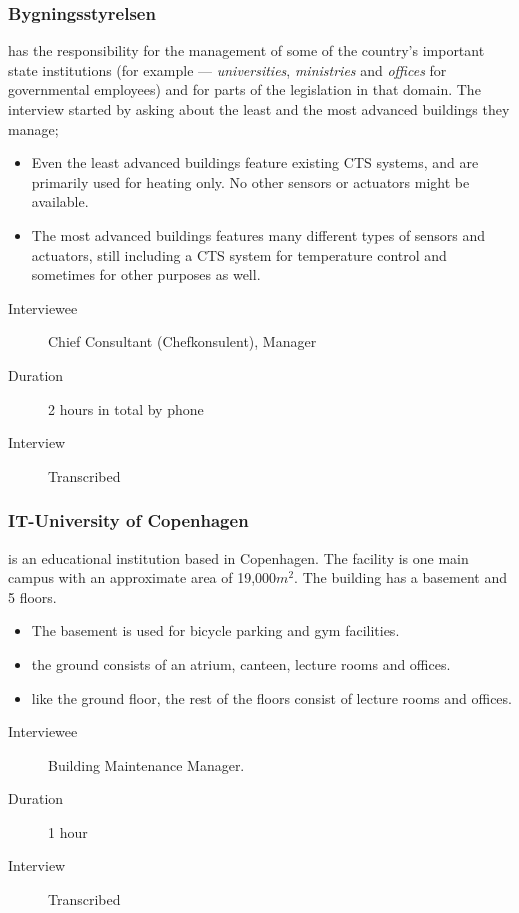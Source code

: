 \subsubsection{Bygningsstyrelsen} has the responsibility for the management of some of the country's important state institutions (for example --- \textit{universities}, \textit{ministries} and \textit{offices} for governmental employees) and for parts of the legislation in that domain. The interview started by asking about the least and the most advanced buildings they manage;
\begin{itemize}
	\item Even the least advanced buildings feature existing CTS systems, and are primarily used for heating only. No other sensors or actuators might be available.
	\item The most advanced buildings features many different types of sensors and actuators, still including a CTS system for temperature control and sometimes for other purposes as well. 
\end{itemize}	
\begin{description}
	\item[Interviewee] Chief Consultant (Chefkonsulent), Manager
	\item[Duration] 2 hours in total by phone
	\item[Interview] Transcribed
\end{description}

\subsubsection{IT-University of Copenhagen} is an educational institution based in Copenhagen. The facility is one main campus with an approximate area of 19,000$m^2$. The building has a basement and 5 floors.
\begin{itemize}
	\item The basement is used for bicycle parking and gym facilities.
	\item the ground consists of an atrium, canteen, lecture rooms and offices.
	\item like the ground floor, the rest of the floors consist of lecture rooms and offices.
\end{itemize}
\begin{description}
	\item[Interviewee] Building Maintenance Manager.
	\item[Duration] 1 hour
	\item[Interview] Transcribed
\end{description}

